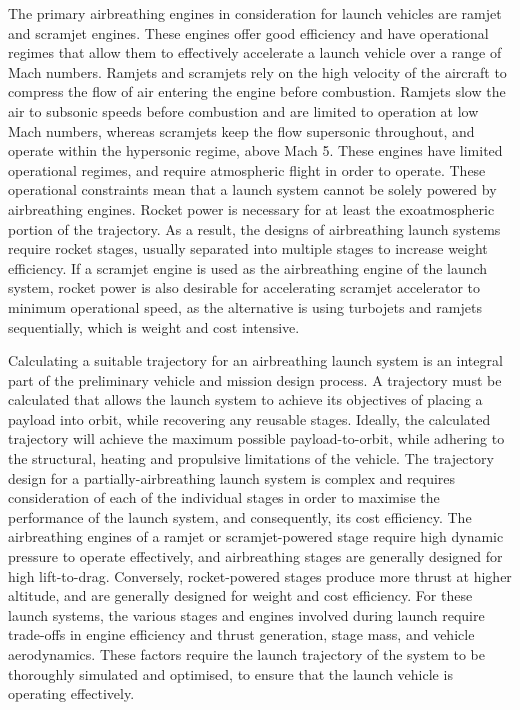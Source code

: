   	The primary airbreathing engines in consideration for launch vehicles are ramjet and scramjet engines\cite{HeiserWilliamPratt1994}. These engines offer good efficiency and have operational regimes that allow them to effectively accelerate a launch vehicle over a range of Mach numbers. 
  	Ramjets and scramjets rely on the high velocity of the aircraft to compress the flow of air entering the engine before combustion.  Ramjets slow the air to subsonic speeds before combustion and are limited to operation at low Mach numbers, whereas scramjets keep the flow supersonic throughout, and operate within the hypersonic regime, above Mach 5. 
  	These engines have limited operational regimes, and require atmospheric flight in order to operate. These operational constraints mean that a launch system cannot be solely powered by airbreathing engines. Rocket power is necessary for at least the exoatmospheric portion of the trajectory. As a result, the designs of airbreathing launch systems require rocket stages, usually separated into multiple stages to increase weight efficiency\cite{Smart2009a}. If a scramjet engine is used as the airbreathing engine of the launch system, rocket power is also desirable for accelerating scramjet accelerator to minimum operational speed, as the alternative is using turbojets and ramjets sequentially\cite{Smart2009a}, which is weight and cost intensive. 
  	
  	 
  	 
  	 Calculating a suitable trajectory for an airbreathing launch system is an integral part of the preliminary vehicle and mission design process. 
  	 A trajectory must be calculated that allows the launch system to achieve its objectives of placing a payload into orbit, while recovering any reusable stages.
  	 Ideally, the calculated trajectory will achieve the maximum possible payload-to-orbit, while adhering to the structural, heating and propulsive limitations of the vehicle.  
  	 The trajectory design for a partially-airbreathing launch system is complex and requires consideration of each of the individual stages in order to maximise the performance of the launch system, and consequently, its cost efficiency. 
  	   The airbreathing engines of a ramjet or scramjet-powered stage require high dynamic pressure to operate effectively, and airbreathing stages are generally designed for high lift-to-drag. Conversely, rocket-powered stages produce more thrust at higher altitude, and are generally designed for weight and cost efficiency. For these launch systems, the various stages and engines involved during launch require trade-offs in engine efficiency and thrust generation, stage mass, and vehicle aerodynamics. These factors require the launch trajectory of the system to be thoroughly simulated and optimised, to ensure that the launch vehicle is operating effectively. 
  
